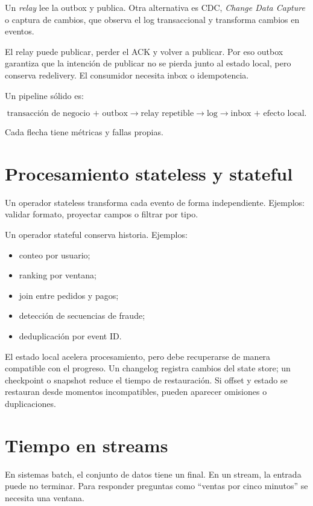 \documentclass[variant=apuntes,cover=institutional,mode=screen]{ua-engineering-v6-article}
\begin{document}
Un \emph{relay} lee la outbox y publica. Otra alternativa es CDC, \emph{Change Data Capture} o captura de cambios, que observa el log transaccional y transforma cambios en eventos.

El relay puede publicar, perder el ACK y volver a publicar. Por eso outbox garantiza que la intención de publicar no se pierda junto al estado local, pero conserva redelivery. El consumidor necesita inbox o idempotencia.

Un pipeline sólido es:

\[
\text{transacción de negocio + outbox}
\rightarrow
\text{relay repetible}
\rightarrow
\text{log}
\rightarrow
\text{inbox + efecto local}.
\]

Cada flecha tiene métricas y fallas propias.

\section{Procesamiento stateless y stateful}

Un operador stateless transforma cada evento de forma independiente. Ejemplos: validar formato, proyectar campos o filtrar por tipo.

Un operador stateful conserva historia. Ejemplos:

\begin{itemize}
\item conteo por usuario;
\item ranking por ventana;
\item join entre pedidos y pagos;
\item detección de secuencias de fraude;
\item deduplicación por event ID.
\end{itemize}

El estado local acelera procesamiento, pero debe recuperarse de manera compatible con el progreso. Un changelog registra cambios del state store; un checkpoint o snapshot reduce el tiempo de restauración. Si offset y estado se restauran desde momentos incompatibles, pueden aparecer omisiones o duplicaciones.

\section{Tiempo en streams}

En sistemas batch, el conjunto de datos tiene un final. En un stream, la entrada puede no terminar. Para responder preguntas como ``ventas por cinco minutos'' se necesita una ventana.
\end{document}
